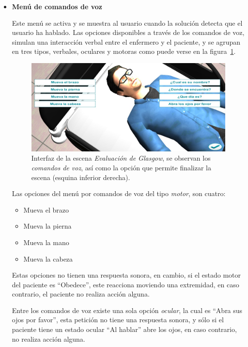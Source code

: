 \begin{itemize}
\item{\textbf{Menú de comandos de voz}}

Este menú se activa y se muestra al usuario cuando la solución detecta que el usuario ha 
hablado. Las opciones disponibles a través de los comandos de voz, simulan una
interacción verbal entre el enfermero y el paciente, y se agrupan en tres
tipos, verbales, oculares y motoras como puede verse en la figura~\ref{fig:glasgow_gui}. 

\begin{figure}[H]
\centering
\includegraphics[scale=0.5]{solucion/images/glasgow_comandos_voz.jpg}
\caption{Interfaz de la escena \emph{Evaluación de Glasgow}, se observan los
    \emph{comandos de voz}, así como la opción que permite finalizar la escena
    (esquina inferior derecha).}
\label{fig:glasgow_gui}
\end{figure}

Las opciones del menú por comandos de voz del tipo \emph{motor}, son cuatro: 

\begin{itemize}
    \item Mueva el brazo
    \item Mueva la pierna
    \item Mueva la mano
    \item Mueva la cabeza
\end{itemize}

Estas opciones no tienen una respuesta sonora, en cambio, si el estado motor del paciente es
\enquote{Obedece}, este reacciona moviendo una extremidad, en caso
contrario, el paciente no realiza acción alguna.

Entre los comandos de voz existe una sola opción \emph{ocular}, la cual es 
\enquote{Abra sus ojos por
favor}, esta petición no tiene una respuesta sonora, y sólo si el paciente tiene un
estado ocular \enquote{Al hablar} abre los ojos, en caso contrario, no realiza
acción alguna.


\end{itemize}
